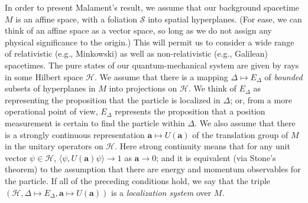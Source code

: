 \documentclass[11pt]{article}
\theoremstyle{remark}
\newcommand{\locsys}{(\mathcal{H},\Delta \mapsto
  E_{\Delta},\mathbf{a}\mapsto U(\mathbf{a}))}
\newcommand{\hil}[1]{\mathcal{#1}}
\begin{document}
In order to present Malament's result, we assume that our background
spacetime $M$ is an affine space, with a foliation $\mathcal{S}$ into
spatial hyperplanes.  (For ease, we can think of an affine space as a
vector space, so long as we do not assign any physical significance to
the origin.)  This will permit us to consider a wide range of
relativistic (e.g., Minkowski) as well as non-relativistic (e.g.,
Galilean) spacetimes.  The pure states of our quantum-mechanical
system are given by rays in some Hilbert space $\hil{H}$.  We assume
that there is a mapping $\Delta \mapsto E_{\Delta}$ of \emph{bounded}
subsets of hyperplanes in $M$ into projections on $\hil{H}$.  We think
of $E_{\Delta}$ as representing the proposition that the particle is
localized in $\Delta$; or, from a more operational point of view,
$E_{\Delta}$ represents the proposition that a position measurement is
certain to find the particle within $\Delta$.  We also assume that
there is a strongly continuous representation $\mathbf{a}\mapsto
U(\mathbf{a})$ of the translation group of $M$ in the unitary
operators on $\hil{H}$.  Here strong continuity means that for any
unit vector $\psi \in \hil{H}$, $\langle \psi,U(\mathbf{a})\psi
\rangle \rightarrow 1$ as $\mathbf{a}\rightarrow 0$; and it is
equivalent (via Stone's theorem) to the assumption that there are
energy and momentum observables for the particle.  If all of the
preceding conditions hold, we say that the triple $\locsys$ is a
\emph{localization system} over $M$.
\end{document}

